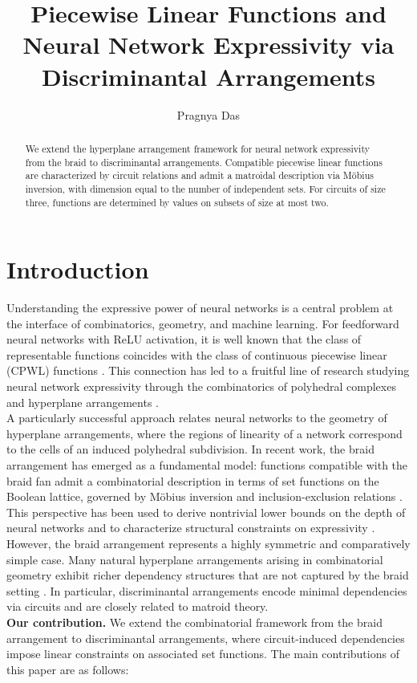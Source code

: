\documentclass{amsart}
\title{Piecewise Linear Functions and Neural Network Expressivity via Discriminantal Arrangements}
\author{Pragnya Das}
\theoremstyle{definition}
\begin{document}
\begin{abstract}
We extend the hyperplane arrangement framework for neural network expressivity from the braid to discriminantal arrangements. Compatible piecewise linear functions are characterized by circuit relations and admit a matroidal description via Möbius inversion, with dimension equal to the number of independent sets. For circuits of size three, functions are determined by values on subsets of size at most two.
\end{abstract}

\maketitle


\section{Introduction}

Understanding the expressive power of neural networks is a central problem at the interface of combinatorics, geometry, and machine learning. For feedforward neural networks with ReLU activation, it is well known that the class of representable functions coincides with the class of continuous piecewise linear (CPWL) functions \cite{cybenko1989, hornik1991,arora2018}. This connection has led to a fruitful line of research studying neural network expressivity through the combinatorics of polyhedral complexes and hyperplane arrangements \cite{hertrich2023}.\\
\noindent
A particularly successful approach relates neural networks to the geometry of hyperplane arrangements, where the regions of linearity of a network correspond to the cells of an induced polyhedral subdivision\cite{hertrich2023, stanley2007, ziegler2012}. In recent work, the braid arrangement has emerged as a fundamental model: functions compatible with the braid fan admit a combinatorial description in terms of set functions on the Boolean lattice, governed by Möbius inversion and inclusion-exclusion relations \cite{grillo2025}. This perspective has been used to derive nontrivial lower bounds on the depth of neural networks and to characterize structural constraints on expressivity \cite{hertrich2023, grillo2025}.\\
\noindent
However, the braid arrangement represents a highly symmetric and comparatively simple case. Many natural hyperplane arrangements arising in combinatorial geometry exhibit richer dependency structures that are not captured by the braid setting \cite{stanley2007, ziegler2012}. In particular, discriminantal arrangements encode minimal dependencies via circuits and are closely related to matroid theory.\\
\noindent
\textbf{Our contribution.}
We extend the combinatorial framework from the braid arrangement to discriminantal arrangements, where circuit-induced dependencies impose linear constraints on associated set functions. The main contributions of this paper are as follows:
\end{document}
